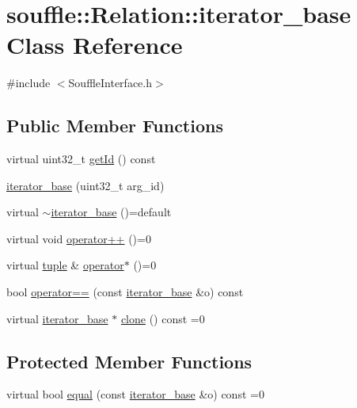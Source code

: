\hypertarget{classsouffle_1_1_relation_1_1iterator__base}{}\section{souffle\+:\+:Relation\+:\+:iterator\+\_\+base Class Reference}
\label{classsouffle_1_1_relation_1_1iterator__base}


{\ttfamily \#include $<$Souffle\+Interface.\+h$>$}

\subsection*{Public Member Functions}
\begin{DoxyCompactItemize}
\item 
virtual uint32\+\_\+t \hyperlink{classsouffle_1_1_relation_1_1iterator__base_a6ff02f8a975c858f6d31941f19e95f08}{get\+Id} () const
\item 
\hyperlink{classsouffle_1_1_relation_1_1iterator__base_aabfa22b6444822cefcce4a1dcb7b796b}{iterator\+\_\+base} (uint32\+\_\+t arg\+\_\+id)
\item 
virtual \hyperlink{classsouffle_1_1_relation_1_1iterator__base_a4ddfcc8daa9eaee6d4863a028c0daf0a}{$\sim$iterator\+\_\+base} ()=default
\item 
virtual void \hyperlink{classsouffle_1_1_relation_1_1iterator__base_a915e207e5f5746aa25e11e38ec936147}{operator++} ()=0
\item 
virtual \hyperlink{classsouffle_1_1tuple}{tuple} \& \hyperlink{classsouffle_1_1_relation_1_1iterator__base_a71a0320e9781c2ca757978d0e785ab30}{operator$\ast$} ()=0
\item 
bool \hyperlink{classsouffle_1_1_relation_1_1iterator__base_a045b6d7b09d4e5494aff9e27d1de7e04}{operator==} (const \hyperlink{classsouffle_1_1_relation_1_1iterator__base}{iterator\+\_\+base} \&o) const
\item 
virtual \hyperlink{classsouffle_1_1_relation_1_1iterator__base}{iterator\+\_\+base} $\ast$ \hyperlink{classsouffle_1_1_relation_1_1iterator__base_a1cc6a6f4cc59a83375f6d109b4391737}{clone} () const =0
\end{DoxyCompactItemize}
\subsection*{Protected Member Functions}
\begin{DoxyCompactItemize}
\item 
virtual bool \hyperlink{classsouffle_1_1_relation_1_1iterator__base_a7436b8e5dcc40cef6ed56684fbbc126e}{equal} (const \hyperlink{classsouffle_1_1_relation_1_1iterator__base}{iterator\+\_\+base} \&o) const =0
\end{DoxyCompactItemize}
